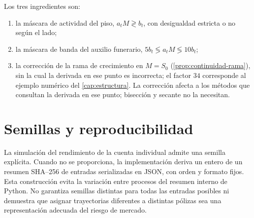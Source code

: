 Los tres ingredientes son:
\begin{enumerate}[leftmargin=*,nosep]
  \item la máscara de actividad del piso, $a_tM\gtrless b_t$, con desigualdad
        estricta o no según el lado;
  \item la máscara de banda del auxilio funerario,
        $5b_t\lessgtr a_tM\lessgtr10b_t$;
  \item la corrección de la rama de crecimiento en $M=S_0$
        (\cref{prop:continuidad-rama}), sin la cual la derivada en ese punto es
        incorrecta; el factor $34$ corresponde al ejemplo numérico del \cref{cap:estructura}. La corrección afecta a los métodos que consultan
        la derivada en ese punto; bisección y secante no la necesitan.
\end{enumerate}

\section{Semillas y reproducibilidad}

La simulación del rendimiento de la cuenta individual admite una semilla
explícita. Cuando no se proporciona, la implementación deriva un entero de un
resumen SHA--256 de entradas serializadas en JSON, con orden y formato fijos.
Esta construcción evita la variación entre procesos del resumen interno de
Python. No garantiza semillas distintas para todas las entradas posibles ni
demuestra que asignar trayectorias diferentes a distintas pólizas sea una
representación adecuada del riesgo de mercado.

